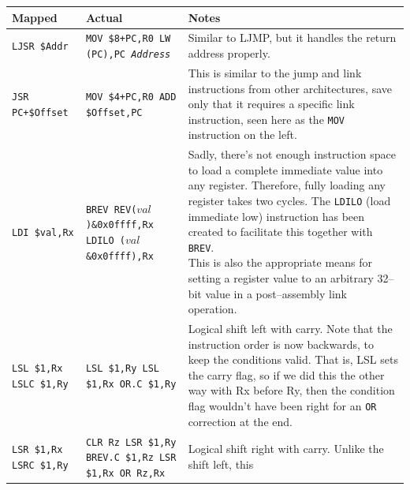 \documentclass{gqtekspec}
\begin{document}
\begin{table}\begin{center}
\begin{tabular}{p{1.1in}p{1.8in}p{3in}}\\\hline
Mapped & Actual  & Notes \\\hline
{\tt LJSR \$Addr  }
	& \parbox[t]{1.5in}{\tt MOV \$8+PC,R0 \\ LW (PC),PC \\ {\em Address}}
	& Similar to LJMP, but it handles the return address properly.
	\\\hline
{\tt JSR PC+\$Offset  }
	& \parbox[t]{1.5in}{\tt MOV \$4+PC,R0 \\ ADD \$Offset,PC}
	& This is similar to the jump and link instructions from other
	architectures, save only that it requires a specific link
	instruction, seen here as the {\tt MOV} instruction on the
	left.\\\hline
{\tt LDI \$val,Rx }
	& \parbox[t]{1.8in}{\tt BREV REV($val$)\&0x0ffff,Rx \\
			LDILO ($val$\&0x0ffff),Rx}
	& \parbox[t]{3.0in}{Sadly, there's not enough instruction
		space to load a complete immediate value into any register.
		Therefore, fully loading any register takes two cycles.
		The {\tt LDILO} (load immediate low) instruction has been
		created to facilitate this together with {\tt BREV}.
		\\
	This is also the appropriate means for setting a register value
	to an arbitrary 32--bit value in a post--assembly link
	operation.}\\\hline
\parbox[t]{1.5in}{\tt LSL \$1,Rx\\ LSLC \$1,Ry}
	& \parbox[t]{1.5in}{\tt LSL \$1,Ry \\
	LSL \$1,Rx \\
	OR.C \$1,Ry}
	& Logical shift left with carry.  Note that the
	instruction order is now backwards, to keep the conditions valid.
	That is, LSL sets the carry flag, so if we did this the other way
	with Rx before Ry, then the condition flag wouldn't have been right
	for an {\tt OR} correction at the end. \\\hline
\parbox[t]{1.5in}{\tt LSR \$1,Rx \\ LSRC \$1,Ry}
	& \parbox[t]{1.5in}{\tt CLR Rz \\
	LSR \$1,Ry \\
	BREV.C \$1,Rz \\
	LSR \$1,Rx \\
	OR Rz,Rx}
	& Logical shift right with carry.  Unlike the shift left, this

\end{tabular}
\end{center}
\end{table}
\end{document}
